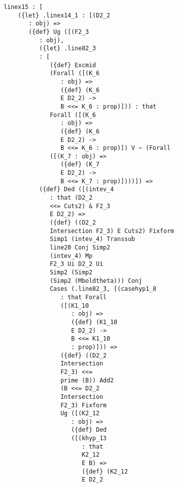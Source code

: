 \documentclass[12pt]{article}
\begin{document}
\begin{verbatim}
               linex15 : [
                   ({let} .linex14_1 : [(D2_2 
                      : obj) => 
                      ({def} Ug ([(F2_3 
                         : obj), 
                         ({let} .line82_3 
                         : [
                            ({def} Excmid 
                            (Forall ([(K_6 
                               : obj) => 
                               ({def} (K_6 
                               E D2_2) -> 
                               B <<= K_6 : prop)])) : that 
                            Forall ([(K_6 
                               : obj) => 
                               ({def} (K_6 
                               E D2_2) -> 
                               B <<= K_6 : prop)]) V ~ (Forall 
                            ([(K_7 : obj) => 
                               ({def} (K_7 
                               E D2_2) -> 
                               B <<= K_7 : prop)])))]) => 
                         ({def} Ded ([(intev_4 
                            : that (D2_2 
                            <<= Cuts2) & F2_3 
                            E D2_2) => 
                            ({def} ((D2_2 
                            Intersection F2_3) E Cuts2) Fixform 
                            Simp1 (intev_4) Transsub 
                            line20 Conj Simp2 
                            (intev_4) Mp 
                            F2_3 Ui D2_2 Ui 
                            Simp2 (Simp2 
                            (Simp2 (Mboldtheta))) Conj 
                            Cases (.line82_3, [(casehyp1_8 
                               : that Forall 
                               ([(K1_10 
                                  : obj) => 
                                  ({def} (K1_10 
                                  E D2_2) -> 
                                  B <<= K1_10 
                                  : prop)])) => 
                               ({def} ((D2_2 
                               Intersection 
                               F2_3) <<= 
                               prime (B)) Add2 
                               (B <<= D2_2 
                               Intersection 
                               F2_3) Fixform 
                               Ug ([(K2_12 
                                  : obj) => 
                                  ({def} Ded 
                                  ([(khyp_13 
                                     : that 
                                     K2_12 
                                     E B) => 
                                     ({def} (K2_12 
                                     E D2_2 

\end{verbatim}
\end{document}

